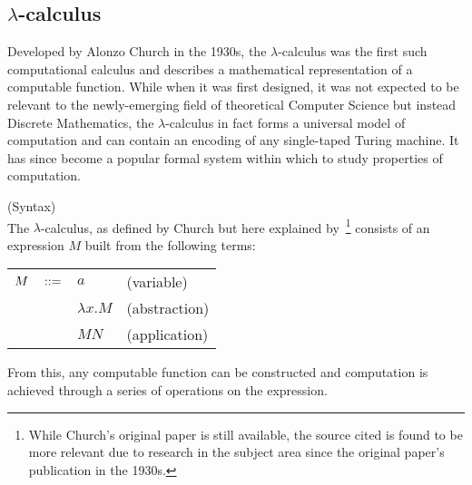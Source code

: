 \subsection{\texorpdfstring{$\lambda$-c}{Lambda C}alculus}\label{ssec:lambda-calculus}

    Developed by Alonzo Church in the 1930s, the $\lambda$-calculus was the first such computational calculus and describes a mathematical representation of a computable function.
    While when it was first designed, it was not expected to be relevant to the newly-emerging field of theoretical Computer Science but instead Discrete Mathematics, the $\lambda$-calculus in fact forms a universal model of computation and can contain an encoding of any single-taped Turing machine.
    It has since become a popular formal system within which to study properties of computation.
    

    \begin{definition}{(Syntax)\\}
        \label{lambda-calculus-syntax}
        The $\lambda$-calculus, as defined by Church but here explained by~\cite{lambda-calculus}\footnote{While Church's original paper is still available, the source cited is found to be more relevant due to research in the subject area since the original paper's publication in the 1930s.} consists of an expression $M$ built from the following terms:
        \begin{center}
            \begin{tabular}{ l l l }
                $M  \quad ::=$       & $a$               & (variable) \\
                                        & $\lambda x . M$   & (abstraction) \\
                                        & $M N$             & (application)
            \end{tabular}
        \end{center}
    \end{definition}
    From this, any computable function can be constructed and computation is achieved through a series of operations on the expression.


